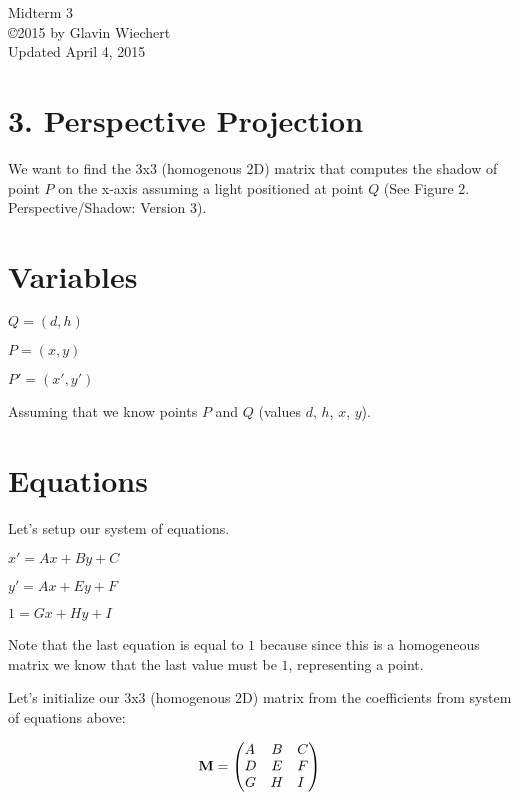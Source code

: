 \documentclass[12pt]{article}
\begin{document}
\begin{center}
{\large Midterm 3} \\ %
\copyright 2015 by Glavin Wiechert \\
Updated April 4, 2015
\end{center}

\section{3. Perspective Projection}

We want to find the 3x3 (homogenous 2D) matrix that 
computes the shadow of point $P$ on the x-axis assuming 
a light positioned at point $Q$ 
(See Figure 2. Perspective/Shadow: Version 3).

\section{Variables}

$Q = (d, h)$

$P = (x,y)$

$P' = (x', y')$

Assuming that we know points $P$ and $Q$ (values $d$, $h$, $x$, $y$).

\section{Equations}

Let's setup our system of equations.

$x' = Ax + By + C$

$y' = Ax + Ey + F$

$1  = Gx + Hy + I$

Note that the last equation is equal to $1$ because 
since this is a homogeneous matrix we know that the 
last value must be $1$, representing a point.

Let's initialize our 3x3 (homogenous 2D) matrix from the 
coefficients from system of equations above:

\begin{align}
\textbf{M} &=
\begin{pmatrix}
A \hfill & B & C \\
D & E & F \hfill \\
G & H & I \hfill 
\end{pmatrix} \nonumber \\
\end{align}
\end{document}

